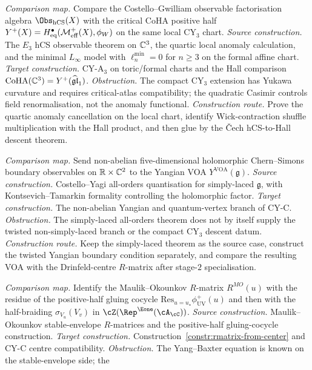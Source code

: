 \begin{description}[leftmargin=2.7em,style=nextline,topsep=0.3ex,itemsep=0.6ex]
 \emph{Comparison map.}
 Compare the Costello--Gwilliam observable factorisation algebra
 $\Obs_{\hCS}(X)$ with the critical CoHA positive half
 $Y^+(X)=H^\bullet_{\mathrm{eq}}(\mathcal{M}^{+}_{\mathrm{eff}}(X),\phi_W)$ on the same
 local CY$_3$ chart.
 \emph{Source construction.}
 The $E_3$ hCS observable theorem on $\mathbb{C}^3$, the quartic local
 anomaly calculation, and the minimal $L_\infty$ model with
 $\ell_n^{\min}=0$ for $n\ge3$ on the formal affine chart.
 \emph{Target construction.}
 CY-A$_3$ on toric/formal charts and the Hall comparison
 $\mathrm{CoHA}(\mathbb{C}^3)=Y^+(\widehat{\mathfrak{gl}}_1)$.
 \emph{Obstruction.}
 The compact CY$_3$ extension has Yukawa curvature and requires
 critical-atlas compatibility; the quadratic Casimir controls
 field renormalisation, not the anomaly functional.
 \emph{Construction route.}
 Prove the quartic anomaly cancellation on the local chart, identify
 Wick-contraction shuffle multiplication with the Hall product, and
 then glue by the \v{C}ech hCS-to-Hall descent theorem.
 \item[\textbf{CM--5D. Boundary hCS to Yangian VOA.}]
 \emph{Comparison map.}
 Send non-abelian five-dimensional holomorphic Chern--Simons boundary
 observables on $\mathbb R\times\mathbb{C}^2$ to the Yangian VOA
 $Y^{\mathrm{VOA}}(\mathfrak g)$.
 \emph{Source construction.}
	 Costello--Yagi all-orders quantisation for simply-laced
 $\mathfrak g$, with Kontsevich--Tamarkin formality controlling the
 holomorphic factor.
 \emph{Target construction.}
 The non-abelian Yangian and quantum-vertex branch of CY-C.
 \emph{Obstruction.}
 The simply-laced all-orders theorem does not by itself supply the
 twisted non-simply-laced branch or the compact CY$_3$ descent datum.
 \emph{Construction route.}
 Keep the simply-laced theorem as the source case, construct the
 twisted Yangian boundary condition separately, and compare the
 resulting VOA with the Drinfeld-centre $R$-matrix after stage-$2$
 specialisation.
 \item[\textbf{CM--MO. Stable-envelope residue to centre half-braiding.}]
 \emph{Comparison map.}
 Identify the Maulik--Okounkov $R$-matrix
 $R^{MO}(u)$ with the residue of the positive-half gluing cocycle
 $\mathrm{Res}_{u=u_\star}\phi^+_{\mathrm{UV}}(u)$ and then with the
 half-braiding $\sigma_{V_u}(V_v)$ in
 $\cZ(\Rep^{\Eone}(\cA_\cC))$.
 \emph{Source construction.}
 Maulik--Okounkov stable-envelope $R$-matrices and the
 positive-half gluing-cocycle construction.
 \emph{Target construction.}
 Construction~\ref{constr:rmatrix-from-center} and CY-C centre
 compatibility.
 \emph{Obstruction.}
 The Yang--Baxter equation is known on the stable-envelope side; the

\end{description}
